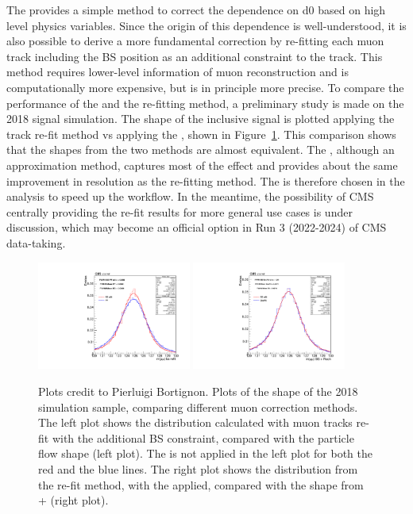 The \GeoFit provides a simple method to correct the \pt dependence on d0 based on high level physics variables.
Since the origin of this \pt dependence is well-understood, it is also possible to derive a more fundamental correction
by re-fitting each muon track including the BS position as an additional constraint to the track.
This method requires lower-level information of muon reconstruction and is computationally more expensive,
but is in principle more precise.
To compare the performance of the \GeoFit and the re-fitting method, a preliminary study is made on the 2018 \ggH signal simulation.
The \mmm shape of the inclusive signal is plotted applying the track re-fit method vs applying the \GeoFit, shown in Figure~\ref{fig:refit_vs_geofit}.
This comparison shows that the \mmm shapes from the two methods are almost equivalent.
The \GeoFit, although an approximation method, captures most of the effect and provides about the same improvement in \mmm resolution as the re-fitting method.
The \GeoFit is therefore chosen in the \hmm analysis to speed up the workflow.
In the meantime, the possibility of CMS centrally providing the re-fit results for more general use cases is under discussion,
which may become an official option in Run 3 (2022-2024) of CMS data-taking.

\begin{figure}[!htb]
      \centering
      \captionsetup{justification=justified}
      \includegraphics[width=0.45\textwidth]{pics/muon_corr/GeoFit/track_refit/ggH_mass_muon_fit_bs_pf_2018.pdf}
      \includegraphics[width=0.45\textwidth]{pics/muon_corr/GeoFit/track_refit/ggH_mass_muon_fit_bs_geofit_2018.pdf}
      \caption{Plots credit to Pierluigi Bortignon.
               Plots of the \mmm shape of the 2018 \ggH simulation sample, comparing different muon correction methods.
               The left plot shows the \mmm distribution calculated with muon tracks re-fit with the additional BS constraint, 
               compared with the particle flow shape (left plot).
               The \RochCorr is not applied in the left plot for both the red and the blue lines.
               The right plot shows the \mmm distribution from the re-fit method, with the \RochCorr applied,
               compared with the shape from \GeoFit + \RochCorr (right plot).
               }
      \label{fig:refit_vs_geofit}
\end{figure}

